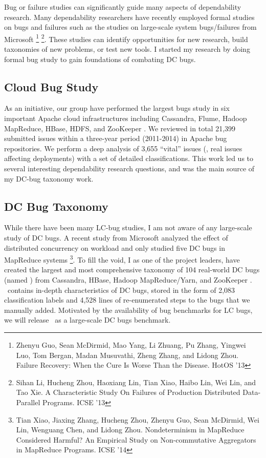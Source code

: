 \documentclass[11pt]{article}
\begin{document}
Bug or failure studies can significantly guide many aspects of dependability
research. Many dependability researchers have recently employed formal studies
on bugs and failures such as the studies on large-scale system bugs/failures
from Microsoft \footnote{Zhenyu Guo, Sean McDirmid, Mao Yang, Li Zhuang, Pu
Zhang, Yingwei Luo, Tom Bergan, Madan Musuvathi, Zheng Zhang, and Lidong Zhou.
Failure Recovery: When the Cure Is Worse Than the Disease. HotOS '13}
\footnote{Sihan Li, Hucheng Zhou, Haoxiang Lin, Tian Xiao, Haibo Lin, Wei Lin,
and Tao Xie. A Characteristic Study On Failures of Production Distributed
Data-Parallel Programs. ICSE '13}. These studies can identify opportunities for
new research, build taxonomies of new problems, or test new tools. I started my
research by doing formal bug study to gain foundations of combating DC bugs.

\subsection{Cloud Bug Study}

As an initiative, our group have performed the largest bugs study in six
important Apache cloud infrastructures including Cassandra, Flume, Hadoop
MapReduce, HBase, HDFS, and ZooKeeper \cite{Gunawi+14-Cbs}. We reviewed in
total 21,399 submitted issues within a three-year period (2011-2014) in Apache
bug repositories. We perform a deep analysis of 3,655 ``vital'' issues (\ie,
real issues affecting deployments) with a set of detailed classifications. This
work led us to several interesting dependability research questions, and was
the main source of my DC-bug taxonomy work.

\subsection{DC Bug Taxonomy} 

While there have been many LC-bug studies, I am not aware of any large-scale
study of DC bugs. A recent study from Microsoft analyzed the effect of
distributed concurrency on workload and only studied five DC bugs in MapReduce
systems \footnote{Tian Xiao, Jiaxing Zhang, Hucheng Zhou, Zhenyu Guo, Sean
McDirmid, Wei Lin, Wenguang Chen, and Lidong Zhou. Nondeterminism in MapReduce
Considered Harmful?  An Empirical Study on Non-commutative Aggregators in
MapReduce Programs. ICSE '14}. To fill the void, I as one of the project
leaders, have created the largest and most comprehensive taxonomy of 104
real-world DC bugs (named \taxdc) from Cassandra, HBase, Hadoop MapReduce/Yarn,
and ZooKeeper \cite{Gunawi+16-TaxDc-Appear}. \taxdc\ contains in-depth
characteristics of DC bugs, stored in the form of 2,083 classification labels
and 4,528 lines of re-enumerated steps to the bugs that we manually added.
Motivated by the availability of bug benchmarks for LC bugs, we will release
\taxdc\ as a large-scale DC bugs benchmark.
\end{document}
